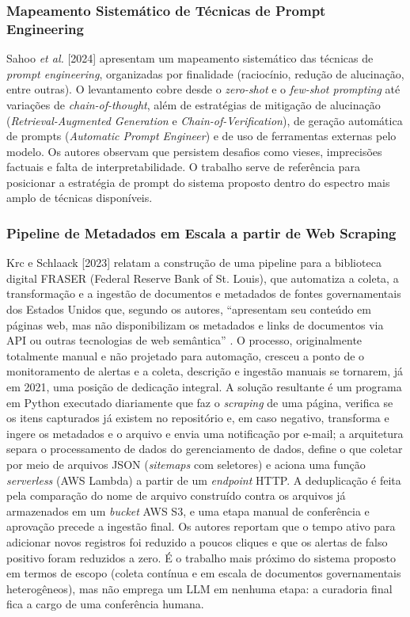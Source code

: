 \documentclass[12pt]{article}
\begin{document}
  \subsubsection{Mapeamento Sistemático de Técnicas de Prompt Engineering}
  Sahoo \emph{et al.} [2024] apresentam um mapeamento sistemático das técnicas de \emph{prompt engineering}, organizadas por finalidade (raciocínio, redução de alucinação, entre outras). O levantamento cobre desde o \emph{zero-shot} e o \emph{few-shot prompting} até variações de \emph{chain-of-thought}, além de estratégias de mitigação de alucinação (\emph{Retrieval-Augmented Generation} e \emph{Chain-of-Verification}), de geração automática de prompts (\emph{Automatic Prompt Engineer}) e de uso de ferramentas externas pelo modelo. Os autores observam que persistem desafios como vieses, imprecisões factuais e falta de interpretabilidade. O trabalho serve de referência para posicionar a estratégia de prompt do sistema proposto dentro do espectro mais amplo de técnicas disponíveis.

  \subsubsection{Pipeline de Metadados em Escala a partir de Web Scraping}
  Krc e Schlaack [2023] relatam a construção de uma pipeline para a biblioteca digital FRASER (Federal Reserve Bank of St. Louis), que automatiza a coleta, a transformação e a ingestão de documentos e metadados de fontes governamentais dos Estados Unidos que, segundo os autores, ``apresentam seu conteúdo em páginas web, mas não disponibilizam os metadados e links de documentos via API ou outras tecnologias de web semântica'' \cite{b3}. O processo, originalmente totalmente manual e não projetado para automação, cresceu a ponto de o monitoramento de alertas e a coleta, descrição e ingestão manuais se tornarem, já em 2021, uma posição de dedicação integral. A solução resultante é um programa em Python executado diariamente que faz o \emph{scraping} de uma página, verifica se os itens capturados já existem no repositório e, em caso negativo, transforma e ingere os metadados e o arquivo e envia uma notificação por e-mail; a arquitetura separa o processamento de dados do gerenciamento de dados, define o que coletar por meio de arquivos JSON (\emph{sitemaps} com seletores) e aciona uma função \emph{serverless} (AWS Lambda) a partir de um \emph{endpoint} HTTP. A deduplicação é feita pela comparação do nome de arquivo construído contra os arquivos já armazenados em um \emph{bucket} AWS S3, e uma etapa manual de conferência e aprovação precede a ingestão final. Os autores reportam que o tempo ativo para adicionar novos registros foi reduzido a poucos cliques e que os alertas de falso positivo foram reduzidos a zero. É o trabalho mais próximo do sistema proposto em termos de escopo (coleta contínua e em escala de documentos governamentais heterogêneos), mas não emprega um LLM em nenhuma etapa: a curadoria final fica a cargo de uma conferência humana.
\end{document}
